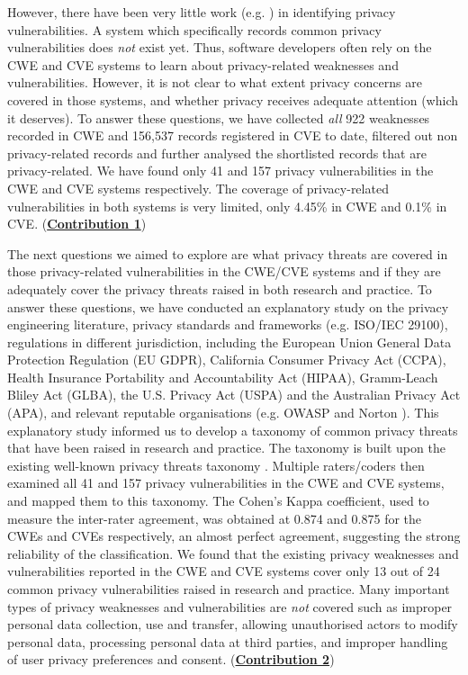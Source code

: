 However, there have been very little work (e.g. \cite{Yang2013, Ma2013}) in identifying privacy vulnerabilities. A system which specifically records common privacy vulnerabilities does \emph{not} exist yet. Thus, software developers often rely on the CWE and CVE systems to learn about privacy-related weaknesses and vulnerabilities. However, it is not clear to what extent privacy concerns are covered in those systems, and whether privacy receives adequate attention (which it deserves). To answer these questions, we have collected \emph{all} 922 weaknesses recorded in CWE and 156,537 records registered in CVE to date, filtered out non privacy-related records and further analysed the shortlisted records that are privacy-related. We have found only 41 and 157 privacy vulnerabilities in the CWE and CVE systems respectively. The coverage of privacy-related vulnerabilities in both systems is very limited, only 4.45\% in CWE and 0.1\% in CVE. (\textbf{\underline{Contribution 1}}) %

The next questions we aimed to explore are what privacy threats are covered in those privacy-related vulnerabilities in the CWE/CVE systems and if they are adequately cover the privacy threats raised in both research and practice. To answer these questions, we have conducted an explanatory study on the privacy engineering literature, privacy standards and frameworks (e.g. ISO/IEC 29100), regulations in different jurisdiction, including the European Union General Data Protection Regulation (EU GDPR), California Consumer Privacy Act (CCPA), Health Insurance Portability and Accountability Act (HIPAA), Gramm-Leach Bliley Act (GLBA), the U.S. Privacy Act (USPA) and the Australian Privacy Act (APA), and relevant reputable organisations (e.g. OWASP \cite{OWASP2020} and Norton \cite{Nortona}). This explanatory study informed us to develop a taxonomy of common privacy threats that have been raised in research and practice. The taxonomy is built upon the existing well-known privacy threats taxonomy \cite{Stallings2019}. Multiple raters/coders then examined all 41 and 157 privacy vulnerabilities in the CWE and CVE systems, and mapped them to this taxonomy. The Cohen’s Kappa coefficient, used to measure the inter-rater agreement, was obtained at 0.874 and 0.875 for the CWEs and CVEs respectively, an almost perfect agreement, suggesting the strong reliability of the classification. We found that the existing privacy weaknesses and vulnerabilities reported in the CWE and CVE systems cover only 13 out of 24 common privacy vulnerabilities raised in research and practice. Many important types of privacy weaknesses and vulnerabilities are \emph{not} covered such as improper personal data collection, use and transfer, allowing unauthorised actors to modify personal data, processing personal data at third parties, and improper handling of user privacy preferences and consent. (\textbf{\underline{Contribution 2}})

